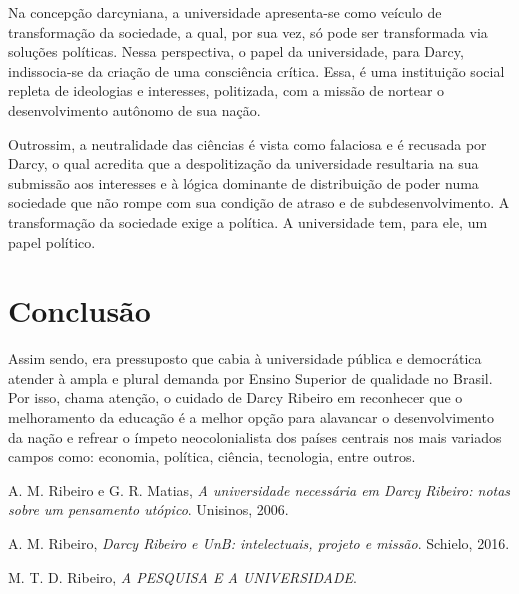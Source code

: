 \documentclass{sbrt}
\begin{document}
Na concepção darcyniana, a universidade apresenta-se como veículo de transformação da sociedade, a qual, por sua vez, só pode ser transformada via soluções políticas. Nessa perspectiva, o papel da universidade, para Darcy, indissocia-se da criação de uma consciência crítica. Essa, é uma instituição social repleta de ideologias e interesses, politizada, com a missão de nortear o desenvolvimento autônomo de sua nação.

Outrossim, a neutralidade das ciências é vista como falaciosa e é recusada por Darcy, o qual acredita que a despolitização da universidade resultaria na sua submissão aos interesses e à lógica dominante de distribuição de poder numa sociedade que não rompe com sua condição de atraso e de subdesenvolvimento. A transformação da sociedade exige a política. A universidade tem, para ele, um papel político.

\section{Conclusão}

Assim sendo, era pressuposto que cabia à universidade pública e democrática atender à ampla e plural demanda por Ensino Superior de qualidade no Brasil. Por isso, chama atenção, o cuidado de Darcy Ribeiro em reconhecer que o melhoramento da educação é a melhor opção para alavancar o desenvolvimento da nação e refrear o ímpeto neocolonialista dos países centrais nos mais variados campos como: economia, política, ciência, tecnologia, entre outros.

\begin{thebibliography}{99}
 A. M. Ribeiro e G. R. Matias, \textit{A universidade necessária em Darcy Ribeiro: notas sobre  um pensamento utópico}. Unisinos, 2006.

 A. M. Ribeiro, \textit{Darcy Ribeiro e UnB: intelectuais, projeto e missão}. Schielo, 2016.

 M. T. D. Ribeiro, \textit{A PESQUISA E A UNIVERSIDADE}.
\end{thebibliography}
\end{document}
